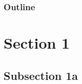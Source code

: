 



\begin{frame}
\titlepage
\end{frame}


\begin{frame}
\frametitle{Outline}
\tableofcontents
\end{frame}






\section{Section 1}\label{Sec1}





\subsection{Subsection 1a}\label{Sub1a}



